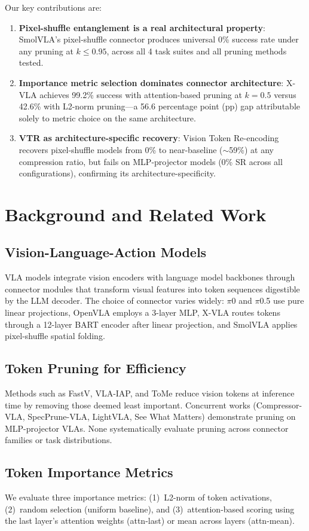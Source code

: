 \documentclass[letterpaper]{article}
\begin{document}
Our key contributions are:
\begin{enumerate}
\item \textbf{Pixel-shuffle entanglement is a real architectural property}: SmolVLA's pixel-shuffle connector produces universal 0\% success rate under any pruning at $k \leq 0.95$, across all 4 task suites and all pruning methods tested.
\item \textbf{Importance metric selection dominates connector architecture}: X-VLA achieves 99.2\% success with attention-based pruning at $k=0.5$ versus 42.6\% with L2-norm pruning---a 56.6 percentage point (pp) gap attributable solely to metric choice on the same architecture.
\item \textbf{VTR as architecture-specific recovery}: Vision Token Re-encoding recovers pixel-shuffle models from 0\% to near-baseline ($\sim$59\%) at any compression ratio, but fails on MLP-projector models (0\% SR across all configurations), confirming its architecture-specificity.
\end{enumerate}

\section{Background and Related Work}

\subsection{Vision-Language-Action Models}
VLA models integrate vision encoders with language model backbones through connector modules that transform visual features into token sequences digestible by the LLM decoder.
The choice of connector varies widely: $\pi$0 and $\pi$0.5 use pure linear projections, OpenVLA employs a 3-layer MLP, X-VLA routes tokens through a 12-layer BART encoder after linear projection, and SmolVLA applies pixel-shuffle spatial folding.

\subsection{Token Pruning for Efficiency}
Methods such as FastV, VLA-IAP, and ToMe reduce vision tokens at inference time by removing those deemed least important.
Concurrent works (Compressor-VLA, SpecPrune-VLA, LightVLA, See What Matters) demonstrate pruning on MLP-projector VLAs.
None systematically evaluate pruning across connector families or task distributions.

\subsection{Token Importance Metrics}
We evaluate three importance metrics: (1)~L2-norm of token activations, (2)~random selection (uniform baseline), and (3)~attention-based scoring using the last layer's attention weights (attn-last) or mean across layers (attn-mean).
\end{document}
